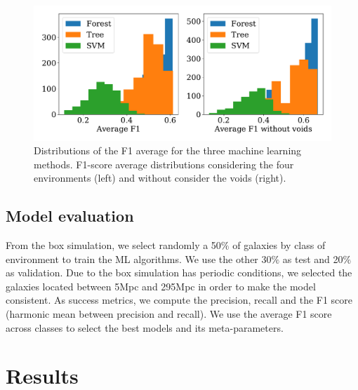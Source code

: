 \documentclass[usenatbib]{mnras}
\begin{document}
\begin{figure}
    \includegraphics[scale=0.46]{Figs/p_hist_f1.pdf}
    \caption{Distributions of the F1 average for the three machine learning methods. F1-score average distributions considering the four environments (left) and without consider the voids (right).}
    \label{fig:methods}
\end{figure}







\subsection{Model evaluation}


From the box simulation, we select randomly a 50$\%$ of galaxies by class of environment to train the ML algorithms. We use the other 30$\%$ as test and  20$\%$ as validation. Due to the box simulation has periodic conditions, we selected the galaxies located between 5Mpc and 295Mpc in order to make the model consistent.  
As success metrics, we compute the precision, recall and the F1 score (harmonic mean between precision and recall).
We use the average F1 score across classes to select the best models and its meta-parameters.

\section{Results}\label{sec:results}
\end{document}
